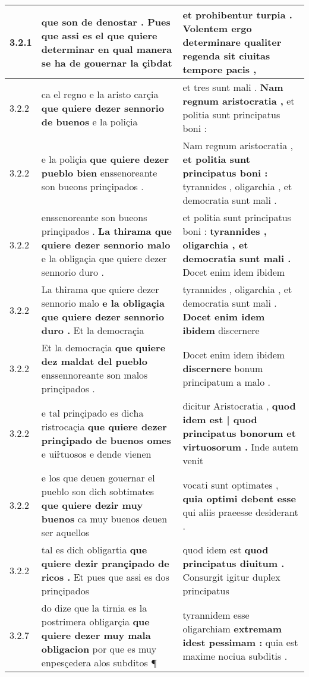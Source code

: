 \begin{tabular}{|p{1cm}|p{6.5cm}|p{6.5cm}|}
3.2.1 & que son de denostar . \textbf{ Pues que assi es el que quiere determinar } en qual manera se ha de gouernar la çibdat & et prohibentur turpia . \textbf{ Volentem ergo determinare qualiter regenda } sit ciuitas tempore pacis , \\\hline
3.2.2 & ca el regno e la aristo carçia \textbf{ que quiere dezer sennorio de buenos } e la poliçia & et tres sunt mali . \textbf{ Nam regnum aristocratia , } et politia sunt principatus boni : \\\hline
3.2.2 & e la poliçia \textbf{ que quiere dezer pueblo bien } enssenoreante son bueons prinçipados . & Nam regnum aristocratia , \textbf{ et politia sunt principatus boni : } tyrannides , oligarchia , et democratia sunt mali . \\\hline
3.2.2 & enssenoreante son bueons prinçipados . \textbf{ La thirama que quiere dezer sennorio malo } e la obligaçia que quiere dezer sennorio duro . & et politia sunt principatus boni : \textbf{ tyrannides , oligarchia , et democratia sunt mali . } Docet enim idem ibidem \\\hline
3.2.2 & La thirama que quiere dezer sennorio malo \textbf{ e la obligaçia que quiere dezer sennorio duro . } Et la democraçia & tyrannides , oligarchia , et democratia sunt mali . \textbf{ Docet enim idem ibidem } discernere \\\hline
3.2.2 & Et la democraçia \textbf{ que quiere dez maldat del pueblo } enssennoreante son malos prinçipados . & Docet enim idem ibidem \textbf{ discernere } bonum principatum a malo . \\\hline
3.2.2 & e tal prinçipado es dicħa ristrocaçia \textbf{ que quiere dezer prinçipado de buenos omes } e uir̉tuosos e dende vienen & dicitur Aristocratia , \textbf{ quod idem est | quod principatus bonorum et virtuosorum . } Inde autem venit \\\hline
3.2.2 & e los que deuen gouernar el pueblo son dich sobtimates \textbf{ que quiere dezir muy buenos } ca muy buenos deuen ser aquellos & vocati sunt optimates , \textbf{ quia optimi debent esse } qui aliis praeesse desiderant . \\\hline
3.2.2 & tal es dich obligartia \textbf{ que quiere dezir prançipado de ricos . } Et pues que assi es dos prinçipados & quod idem est \textbf{ quod principatus diuitum . } Consurgit igitur duplex principatus \\\hline
3.2.7 & do dize que la tirnia es la postrimera obligarçia \textbf{ que quiere dezer muy mala obligacion } por que es muy enpesçedera alos subditos ¶ & tyrannidem esse oligarchiam \textbf{ extremam idest pessimam : } quia est maxime nociua subditis . \\\hline

\end{tabular}
